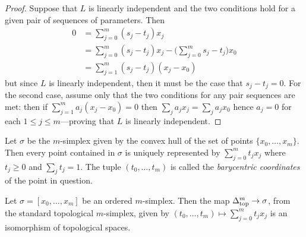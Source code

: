 \begin{proof}
Suppose that \(L\) is linearly independent and the two conditions hold for a given
pair of sequences of parameters. Then
\begin{align*}
  0 &= \sum_{j=0}^m (s_j - t_j) x_j \\
  &= \sum_{j=0}^m (s_j - t_j) x_j - \Big( \sum_{j=0}^m s_j - t_j \Big) x_0 \\
  &= \sum_{j=1}^{m} (s_j - t_j) (x_j - x_0)
\end{align*}
but since \(L\) is linearly independent, then it must be the case that
\(s_j - t_j = 0\). For the second case, assume only that the two conditions for
any pair sequences are met: then if \(\sum_{j=1}^m a_j (x_j - x_0) = 0\) then
\(\sum_j a_j x_j = \sum_j a_j x_0\) hence \(a_j = 0\) for each
\(1 \leq j \leq m\)---proving that \(L\) is linearly independent.
\end{proof}

\begin{corollary}
\label{cor:barycentric-coordinates-simplex}
Let \(\sigma\) be the \(m\)-simplex given by the convex hull of the set of
points \(\{x_0, \dots, x_m\}\). Then every point contained in \(\sigma\) is
uniquely represented by \(\sum_{j=0}^m t_j x_j\) where \(t_j \geq 0\) and
\(\sum_j t_j = 1\). The tuple \((t_0, \dots, t_m)\) is called the
\emph{barycentric coordinates} of the point in question.
\end{corollary}

\begin{corollary}
\label{cor:ordered-simplex-iso-standard-simplex}
Let \(\sigma = [x_0, \dots, x_m]\) be an ordered \(m\)-simplex. Then the  map
\(\Delta_{\text{top}}^m \to \sigma\), from the standard topological \(m\)-simplex, given by
\((t_0, \dots, t_m) \mapsto \sum_{j=0}^m t_j x_j\) is an isomorphism of
topological spaces.
\end{corollary}


